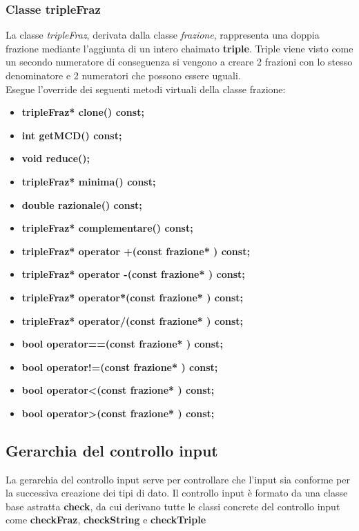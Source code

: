 \documentclass[a4paper,10pt]{article}
\begin{document}
    \subsubsection{Classe tripleFraz}
        La classe \textit{tripleFraz}, derivata dalla classe \textit{frazione}, rappresenta una doppia frazione mediante l'aggiunta di un intero chaimato \textbf{triple}. Triple viene visto come un secondo numeratore di conseguenza si vengono a creare 2 frazioni con lo stesso denominatore e 2 numeratori che possono essere  uguali.
        \\Esegue l'override dei seguenti metodi virtuali della classe frazione:
        \begin{itemize}
            \item \textbf{tripleFraz* clone() const;}
            \item \textbf{int getMCD() const;}
            \item \textbf{void reduce();}
            \item \textbf{tripleFraz* minima() const;}
            \item \textbf{double razionale() const;}
            \item \textbf{tripleFraz* complementare() const;}
            \item \textbf{tripleFraz* operator +(const frazione* ) const;}
            \item \textbf{tripleFraz* operator -(const frazione* ) const;}
            \item \textbf{tripleFraz* operator*(const frazione* ) const;}
            \item \textbf{tripleFraz* operator/(const frazione* ) const;}
            \item \textbf{bool operator==(const frazione* ) const;}
            \item \textbf{bool operator!=(const frazione* ) const;}
            \item \textbf{bool operator<(const frazione* ) const;}
            \item \textbf{bool operator>(const frazione* ) const;}
        \end{itemize}
    \newpage
    \subsection{Gerarchia del controllo input}
        La gerarchia del controllo input serve per controllare che l'input sia conforme  per la successiva creazione dei tipi di dato. Il controllo input è formato da una classe base astratta \textbf{check}, da cui derivano tutte le classi concrete del controllo input come \textbf{checkFraz}, \textbf{checkString} e \textbf{checkTriple}
\end{document}
